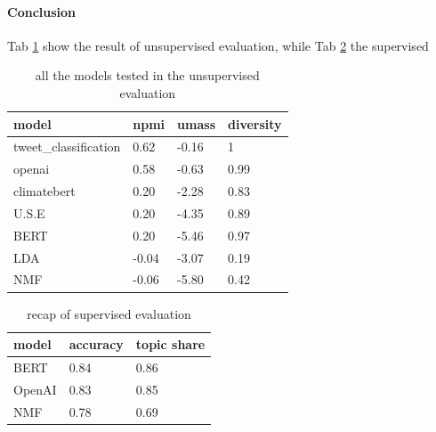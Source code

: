 \paragraph{Conclusion}
Tab \ref{tab:unsupervised_recap} show the result of unsupervised evaluation, while Tab \ref{tab:supervised recap } the supervised


\begin{table}[]
\centering
\begin{tabular}{|llll|}
\hline
\textbf{model}                              & \textbf{npmi} & \textbf{umass} & \textbf{diversity} \\ \hline
\multicolumn{1}{|l|}{tweet\_classification} & 0.62          & -0.16          & 1                  \\
\multicolumn{1}{|l|}{openai}                & 0.58          & -0.63          & 0.99               \\
\multicolumn{1}{|l|}{climatebert}           & 0.20          & -2.28          & 0.83               \\
\multicolumn{1}{|l|}{U.S.E}                 & 0.20          & -4.35          & 0.89               \\
\multicolumn{1}{|l|}{BERT}                  & 0.20          & -5.46          & 0.97               \\
\multicolumn{1}{|l|}{LDA}                   & -0.04         & -3.07          & 0.19               \\
\multicolumn{1}{|l|}{NMF}                   & -0.06         & -5.80          & 0.42               \\ \hline
\end{tabular}
\caption{all the models tested in the unsupervised evaluation}
\label{tab:unsupervised_recap}
\end{table}

\begin{table}[]
\centering
\begin{tabular}{|l|ll|}
\hline
model  & accuracy & topic share \\ \hline
BERT   & 0.84     & 0.86        \\
OpenAI & 0.83     & 0.85        \\
NMF    & 0.78     & 0.69        \\ \hline
\end{tabular}
\caption{recap of supervised evaluation}
\label{tab:supervised recap }
\end{table}


